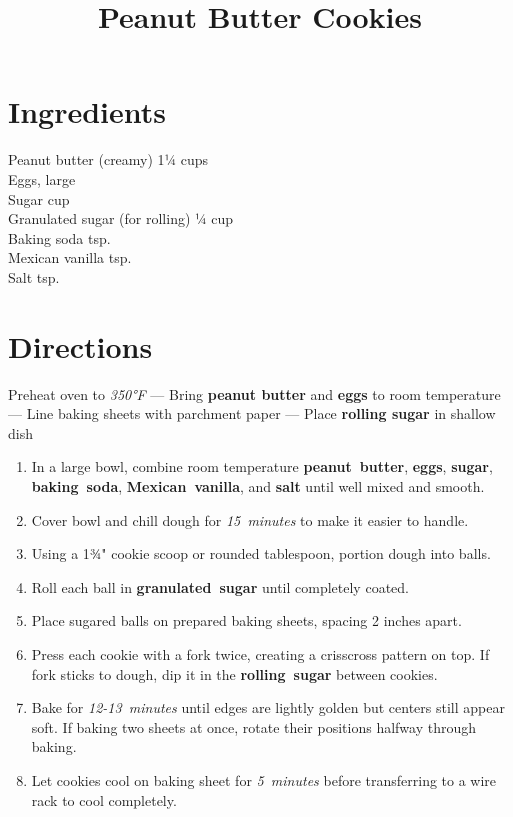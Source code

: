 \documentclass[11pt,letterpaper]{article}
\title{Peanut Butter Cookies}
\author{}
\date{}
\begin{document}
\maketitle
\thispagestyle{empty}

\section*{Ingredients}
\setlength{\columnsep}{20pt}
\begin{multicols}{2}
\noindent
    Peanut butter (creamy) \dotfill 1¼ cups \\
    Eggs, large  \\
    Sugar  cup \\
    Granulated sugar (for rolling) \dotfill ¼ cup \\
    Baking soda  tsp. \\
    Mexican vanilla  tsp. \\
    Salt  tsp.
\end{multicols}

\section*{Directions}

\noindent
Preheat oven to \textit{350°F} ---
Bring \textbf{peanut butter} and \textbf{eggs} to room temperature ---
Line baking sheets with parchment paper ---
Place \textbf{rolling sugar} in shallow dish

\begin{enumerate}
    \item In a large bowl, combine room temperature \textbf{peanut~butter}, \textbf{eggs}, \textbf{sugar}, \textbf{baking~soda}, \textbf{Mexican~vanilla}, and \textbf{salt} until well mixed and smooth.
    
    \item Cover bowl and chill dough for \textit{15~minutes} to make it easier to handle.
    
    \item Using a 1¾" cookie scoop or rounded tablespoon, portion dough into balls.
    
    \item Roll each ball in \textbf{granulated~sugar} until completely coated.
    
    \item Place sugared balls on prepared baking sheets, spacing 2 inches apart.
    
    \item Press each cookie with a fork twice, creating a crisscross pattern on top. If fork sticks to dough, dip it in the \textbf{rolling~sugar} between cookies.
    
    \item Bake for \textit{12-13~minutes} until edges are lightly golden but centers still appear soft. If baking two sheets at once, rotate their positions halfway through baking.
    
    \item Let cookies cool on baking sheet for \textit{5~minutes} before transferring to a wire rack to cool completely.
\end{enumerate}
\end{document}
